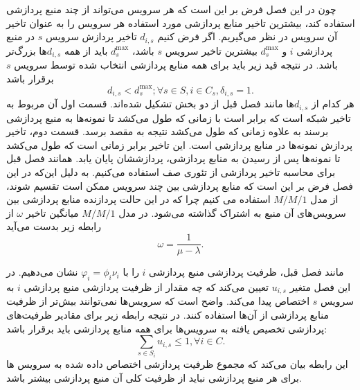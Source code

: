     چون در این فصل فرض بر این است که هر سرویس می‌تواند از چند منبع پردازشی استفاده کند، بیشترین تاخیر منابع پردازشی مورد استفاده هر سرویس‌ را به عنوان تاخیر آن سرویس در نظر می‌گیریم.
    اگر فرض کنیم $d_{i,s}$ تاخیر پردازش سرویس $s$ در منبع پردازشی $i$ و $d_s^\text{max}$ بیشترین تاخیر سرویس $s$ باشد، $d_s^\text{max}$ باید از همه $d_{i,s}$ها بزرگ‌تر باشد.
    در نتیجه قید زیر باید برای همه منابع پردازشی انتخاب شده توسط سرویس $s$ برقرار باشد
    \begin{equation}\label{eqn:max_delay}
      d_{i,s} < d_s^\text{max}; \forall s \in S, i \in C_s, \delta_{i,s} = 1.
    \end{equation}
    هر کدام از $d_{i,s}$ها مانند فصل قبل از دو بخش تشکیل شده‌اند.
    قسمت اول آن مربوط به تاخیر شبکه است که برابر است با زمانی که طول می‌کشد تا نمونه‌ها به منبع پردازشی برسند به علاوه زمانی که طول می‌کشد نتیجه به مقصد برسد.
    قسمت دوم، تاخیر پردازش نمونه‌ها در منابع پردازشی است.
    این تاخیر برابر زمانی است که طول می‌کشد تا نمونه‌ها پس از رسیدن به منابع پردازشی، پردازششان پایان یابد.
    همانند فصل قبل برای محاسبه تاخیر پردازشی از تئوری صف استفاده می‌کنیم.
    به دلیل این‌که در این فصل فرض بر این است که منابع پردازشی بین چند سرویس ممکن است تقسیم شوند، از مدل $M/M/1$ استفاده می کنیم چرا که در این حالت پردازنده منابع پردازشی بین سرویس‌های آن منبع به اشتراک گذاشته می‌شود.
    در مدل $M/M/1$ میانگین تاخیر $\omega$ از رابطه زیر بدست می‌آید\cite{basic_queueing_sztrik}
    \begin{equation}
      \omega = \frac{1}{\mu-\lambda}.
    \end{equation}

    مانند فصل قبل، ظرفیت پردازشی منبع پردازشی $i$ را با $\varphi_i = \phi_i \nu_i$ نشان می‌دهیم.
    در این فصل متغیر $u_{i,s}$ تعیین می‌کند که چه مقدار از ظرفیت پردازشی منبع پردازشی $i$ به سرویس $s$ اختصاص پیدا می‌کند.
    واضح است که سرویس‌ها نمی‌توانند بیش‌تر از ظرفیت منابع پردازشی از آن‌ها استفاده کنند.
    در نتیجه رابطه زیر برای مقادیر ظرفیت‌های پردازشی تخصیص یافته به سرویس‌ها برای همه منابع پردازشی باید برقرار باشد:
    \begin{equation}
      \sum_{s \in S_i} u_{i,s} \le 1, \forall i \in C.
    \end{equation}
    این رابطه بیان می‌کند که مجموع ظرفیت پردازشی اختصاص داده شده به سرویس ها برای هر منبع پردازشی نباید از ظرفیت کلی آن منبع پردازشی بیشتر باشد.

